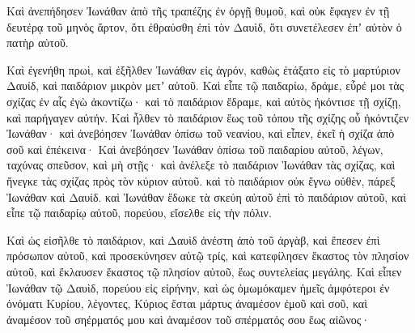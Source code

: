 {Καὶ ἀνεπήδησεν Ἰωνάθαν ἀπὸ τῆς τραπέζης ἐν ὀργῇ θυμοῦ, καὶ οὐκ ἔφαγεν ἐν τῇ δευτέρᾳ τοῦ μηνὸς ἄρτον, ὅτι ἐθραύσθη ἐπὶ τὸν Δαυὶδ, ὅτι συνετέλεσεν ἐπʼ αὐτὸν ὁ πατὴρ αὐτοῦ.
\par }{\PP {}Καὶ ἐγενήθη πρωὶ, καὶ ἐξῆλθεν Ἰωνάθαν εἰς ἀγρόν, καθὼς ἐτάξατο εἰς τὸ μαρτύριον Δαυίδ, καὶ παιδάριον μικρὸν μετʼ αὐτοῦ.
Καὶ εἶπε τῷ παιδαρίω, δράμε, εὗρέ μοι τὰς σχίζας ἐν αἷς ἐγὼ ἀκοντίζω· καὶ τὸ παιδάριον ἔδραμε, καὶ αὐτὸς ἠκόντισε τῇ σχίζῃ, καὶ παρήγαγεν αὐτήν.
Καὶ ἦλθεν τὸ παιδάριον ἕως τοῦ τόπου τῆς σχίζης οὗ ἠκόντιζεν Ἰωνάθαν· καὶ ἀνεβόησεν Ἰωνάθαν ὀπίσω τοῦ νεανίου, καὶ εἶπεν, ἐκεῖ ἡ σχίζα ἀπὸ σοῦ καὶ ἐπέκεινα·
Καὶ ἀνεβόησεν Ἰωνάθαν ὀπίσω τοῦ παιδαρίου αὐτοῦ, λέγων, ταχύνας σπεῦσον, καὶ μὴ στῇς· καὶ ἀνέλεξε τὸ παιδάριον Ἰωνάθαν τὰς σχίζας, καὶ ἤνεγκε τὰς σχίζας πρὸς τὸν κύριον αὐτοῦ.
καὶ τὸ παιδάριον οὐκ ἔγνω οὐθὲν, πάρεξ Ἰωνάθαν καὶ Δαυίδ.
καὶ Ἰωνάθαν ἔδωκε τὰ σκεύη αὐτοῦ ἐπὶ τὸ παιδάριον αὐτοῦ, καὶ εἶπε τῷ παιδαρίῳ αὐτοῦ, πορεύου, εἴσελθε εἰς τὴν πόλιν.
\par }{\PP {}Καὶ ὡς εἰσῆλθε τὸ παιδάριον, καὶ Δαυὶδ ἀνέστη ἀπὸ τοῦ ἀργὰβ, καὶ ἔπεσεν ἐπὶ πρόσωπον αὐτοῦ, καὶ προσεκύνησεν αὐτῷ τρίς, καὶ κατεφίλησεν ἕκαστος τὸν πλησίον αὐτοῦ, καὶ ἔκλαυσεν ἕκαστος τῷ πλησίον αὐτοῦ, ἕως συντελείας μεγάλης.
Καὶ εἶπεν Ἰωνάθαν τῷ Δαυὶδ, πορεύου εἰς εἰρήνην, καὶ ὡς ὀμωμόκαμεν ἡμεῖς ἀμφότεροι ἐν ὀνόματι Κυρίου, λέγοντες, Κύριος ἔσται μάρτυς ἀναμέσον ἐμοῦ καὶ σοῦ, καὶ ἀναμέσον τοῦ σηέρματός μου καὶ ἀναμέσον τοῦ σπέρματός σου ἕως αἰῶνος·

}
